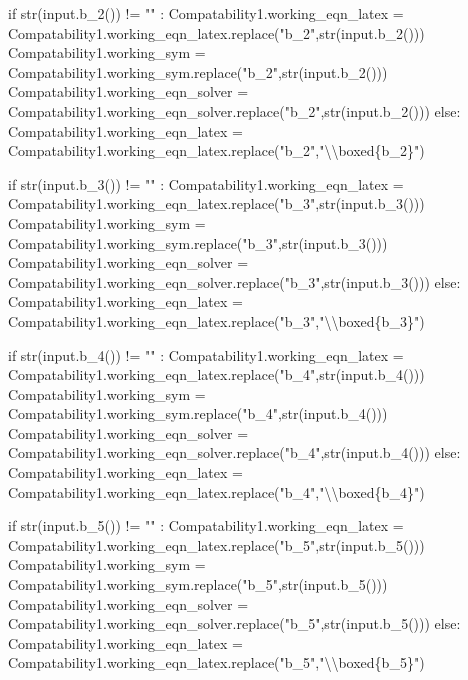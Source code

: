 \documentclass[
  letterpaper,
  DIV=11,
  numbers=noendperiod]{scrreprt}
\newenvironment{Shaded}{\begin{snugshade}}{\end{snugshade}}
\newcommand{\NormalTok}[1]{\textcolor[rgb]{0.00,0.23,0.31}{#1}}
\begin{document}
\begin{Shaded}
\begin{Highlighting}[]
\NormalTok{            if str(input.b\_2()) != "" : }
\NormalTok{                Compatability1.working\_eqn\_latex = Compatability1.working\_eqn\_latex.replace("b\_2",str(input.b\_2()))}
\NormalTok{                Compatability1.working\_sym = Compatability1.working\_sym.replace("b\_2",str(input.b\_2()))}
\NormalTok{                Compatability1.working\_eqn\_solver = Compatability1.working\_eqn\_solver.replace("b\_2",str(input.b\_2()))}
\NormalTok{            else:}
\NormalTok{                Compatability1.working\_eqn\_latex = Compatability1.working\_eqn\_latex.replace("b\_2","\textbackslash{}\textbackslash{}boxed\{b\_2\}")}
            
\NormalTok{            if str(input.b\_3()) != "" : }
\NormalTok{                Compatability1.working\_eqn\_latex = Compatability1.working\_eqn\_latex.replace("b\_3",str(input.b\_3()))}
\NormalTok{                Compatability1.working\_sym = Compatability1.working\_sym.replace("b\_3",str(input.b\_3()))}
\NormalTok{                Compatability1.working\_eqn\_solver = Compatability1.working\_eqn\_solver.replace("b\_3",str(input.b\_3()))}
\NormalTok{            else:}
\NormalTok{                Compatability1.working\_eqn\_latex = Compatability1.working\_eqn\_latex.replace("b\_3","\textbackslash{}\textbackslash{}boxed\{b\_3\}")}
            
\NormalTok{            if str(input.b\_4()) != "" : }
\NormalTok{                Compatability1.working\_eqn\_latex = Compatability1.working\_eqn\_latex.replace("b\_4",str(input.b\_4()))}
\NormalTok{                Compatability1.working\_sym = Compatability1.working\_sym.replace("b\_4",str(input.b\_4()))}
\NormalTok{                Compatability1.working\_eqn\_solver = Compatability1.working\_eqn\_solver.replace("b\_4",str(input.b\_4()))}
\NormalTok{            else:}
\NormalTok{                Compatability1.working\_eqn\_latex = Compatability1.working\_eqn\_latex.replace("b\_4","\textbackslash{}\textbackslash{}boxed\{b\_4\}")}
            
\NormalTok{            if str(input.b\_5()) != "" : }
\NormalTok{                Compatability1.working\_eqn\_latex = Compatability1.working\_eqn\_latex.replace("b\_5",str(input.b\_5()))}
\NormalTok{                Compatability1.working\_sym = Compatability1.working\_sym.replace("b\_5",str(input.b\_5()))}
\NormalTok{                Compatability1.working\_eqn\_solver = Compatability1.working\_eqn\_solver.replace("b\_5",str(input.b\_5()))}
\NormalTok{            else:}
\NormalTok{                Compatability1.working\_eqn\_latex = Compatability1.working\_eqn\_latex.replace("b\_5","\textbackslash{}\textbackslash{}boxed\{b\_5\}")}


\end{Highlighting}
\end{Shaded}
\end{document}
